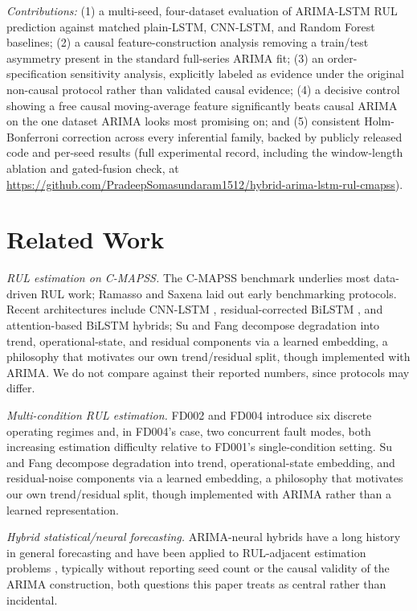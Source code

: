 \documentclass[conference]{IEEEtran}
\newif\ifblind
\begin{document}
\emph{Contributions:} (1) a multi-seed, four-dataset evaluation of ARIMA-LSTM RUL prediction against matched plain-LSTM, CNN-LSTM, and Random Forest baselines; (2) a causal feature-construction analysis removing a train/test asymmetry present in the standard full-series ARIMA fit; (3) an order-specification sensitivity analysis, explicitly labeled as evidence under the original non-causal protocol rather than validated causal evidence; (4) a decisive control showing a free causal moving-average feature significantly beats causal ARIMA on the one dataset ARIMA looks most promising on; and (5) consistent Holm-Bonferroni correction across every inferential family, backed by publicly released code and per-seed results (full experimental record, including the window-length ablation and gated-fusion check, at \ifblind [repository URL withheld for blind review]\else \url{https://github.com/PradeepSomasundaram1512/hybrid-arima-lstm-rul-cmapss}\fi).

\section{Related Work}
\emph{RUL estimation on C-MAPSS.} The C-MAPSS benchmark \cite{saxena2008} underlies most data-driven RUL work; Ramasso and Saxena \cite{cmapssbenchmark2014} laid out early benchmarking protocols. Recent architectures include CNN-LSTM \cite{cnnlstm2024}, residual-corrected BiLSTM \cite{biclstm2026}, and attention-based BiLSTM \cite{sharma2025} hybrids; Su and Fang \cite{multiheadattn2026} decompose degradation into trend, operational-state, and residual components via a learned embedding, a philosophy that motivates our own trend/residual split, though implemented with ARIMA. We do not compare against their reported numbers, since protocols may differ.

\emph{Multi-condition RUL estimation.} FD002 and FD004 introduce six discrete operating regimes and, in FD004's case, two concurrent fault modes, both increasing estimation difficulty relative to FD001's single-condition setting. Su and Fang \cite{multiheadattn2026} decompose degradation into trend, operational-state embedding, and residual-noise components via a learned embedding, a philosophy that motivates our own trend/residual split, though implemented with ARIMA rather than a learned representation.

\emph{Hybrid statistical/neural forecasting.} ARIMA-neural hybrids have a long history in general forecasting \cite{zhang2003} and have been applied to RUL-adjacent estimation problems \cite{arimalstmvalve2022}, typically without reporting seed count or the causal validity of the ARIMA construction, both questions this paper treats as central rather than incidental.
\end{document}

